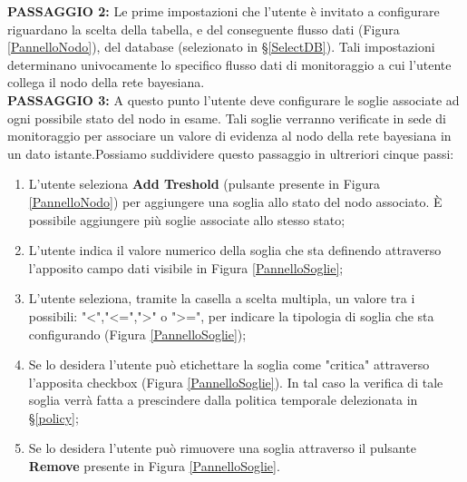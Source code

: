 \pagebreak

\textbf{PASSAGGIO 2:} Le prime impostazioni che l'utente è invitato a configurare riguardano la scelta della tabella, e del conseguente flusso dati (Figura \ref{PannelloNodo}), del database (selezionato in §\ref{SelectDB}). Tali impostazioni determinano univocamente lo specifico flusso dati di monitoraggio a cui l'utente collega il nodo della rete bayesiana.
~\\

\textbf{PASSAGGIO 3:} A questo punto l'utente deve configurare le soglie associate ad ogni possibile stato del nodo in esame. Tali soglie verranno verificate in sede di monitoraggio per associare un valore di evidenza al nodo della rete bayesiana in un dato istante.Possiamo suddividere questo passaggio in ultreriori cinque passi:
\begin{enumerate}
	\item L'utente seleziona \textbf{Add Treshold} (pulsante presente in Figura \ref{PannelloNodo}) per aggiungere una soglia allo stato del nodo associato. È possibile aggiungere più soglie associate allo stesso stato;
	\item L'utente indica il valore numerico della soglia che sta definendo attraverso l'apposito campo dati visibile in Figura \ref{PannelloSoglie};
	\item L'utente seleziona, tramite la casella a scelta multipla, un valore tra i possibili: "<","<=",">" o ">=", per indicare la tipologia di soglia che sta configurando (Figura \ref{PannelloSoglie});
	\item Se lo desidera l'utente può etichettare la soglia come "critica" attraverso l'apposita checkbox (Figura \ref{PannelloSoglie}). In tal caso la verifica di tale soglia verrà fatta a prescindere dalla politica temporale delezionata in §\ref{policy};
	\item Se lo desidera l'utente può rimuovere una soglia attraverso il pulsante \textbf{Remove} presente in Figura \ref{PannelloSoglie}.
\end{enumerate}

